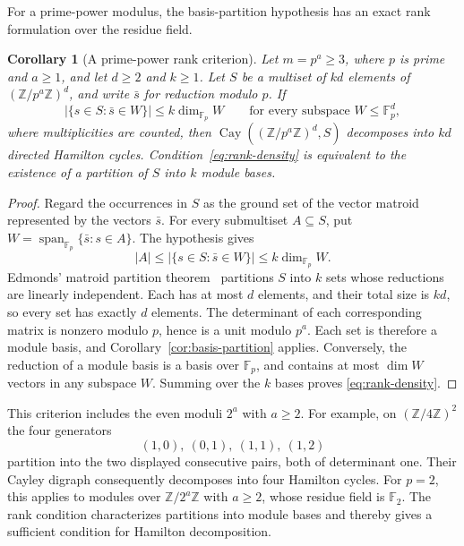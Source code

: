 \documentclass[11pt,reqno]{amsart}
\numberwithin{equation}{section}
\newtheorem{corollary}[theorem]{Corollary}
\theoremstyle{definition}
\theoremstyle{remark}
\newcommand{\Z}{\mathbb Z}
\newcommand{\Cay}{\operatorname{Cay}}
\begin{document}
For a prime-power modulus, the basis-partition hypothesis has an exact
rank formulation over the residue field.

\begin{corollary}[A prime-power rank criterion]\label{cor:prime-power-rank}
Let $m=p^a\ge3$, where $p$ is prime and $a\ge1$, and let $d\ge2$ and $k\ge1$.
Let $S$ be a multiset of $kd$ elements of $(\Z/p^a\Z)^d$, and write $\bar s$
for reduction modulo $p$. If
\begin{equation}\label{eq:rank-density}
 \bigl|\{s\in S:\bar s\in W\}\bigr|\le k\dim_{\mathbb F_p}W
 \qquad\text{for every subspace }W\le\mathbb F_p^d,
\end{equation}
where multiplicities are counted, then $\Cay((\Z/p^a\Z)^d,S)$ decomposes into
$kd$ directed Hamilton cycles. Condition~\eqref{eq:rank-density} is equivalent
to the existence of a partition of $S$ into $k$ module bases.
\end{corollary}
\begin{proof}
Regard the occurrences in $S$ as the ground set of the vector matroid
represented by the vectors $\bar s$. For every submultiset $A\subseteq S$,
put $W=\operatorname{span}_{\mathbb F_p}\{\bar s:s\in A\}$. The hypothesis gives
\[
 |A|\le\bigl|\{s\in S:\bar s\in W\}\bigr|
       \le k\dim_{\mathbb F_p}W.
\]
Edmonds' matroid partition theorem~\cite[Theorem~1]{Edmonds65} partitions $S$
into $k$ sets whose reductions are linearly independent. Each has at most $d$
elements, and their total size is $kd$, so every set has exactly $d$ elements.
The determinant of each corresponding matrix is nonzero modulo $p$, hence is
a unit modulo $p^a$. Each set is therefore a module basis, and
Corollary~\ref{cor:basis-partition} applies. Conversely, the reduction of a
module basis is a basis over $\mathbb F_p$, and contains at most $\dim W$
vectors in any subspace $W$. Summing over the $k$ bases proves
\eqref{eq:rank-density}.
\end{proof}

This criterion includes the even moduli $2^a$ with $a\ge2$. For example, on
$(\Z/4\Z)^2$ the four generators
\[
 (1,0),\ (0,1),\ (1,1),\ (1,2)
\]
partition into the two displayed consecutive pairs, both of determinant one.
Their Cayley digraph consequently decomposes into four Hamilton cycles.
For $p=2$, this applies to modules over $\Z/2^a\Z$ with $a\ge2$,
whose residue field is $\mathbb F_2$. The rank condition characterizes
partitions into module bases and thereby gives a sufficient condition
for Hamilton decomposition.
\end{document}
